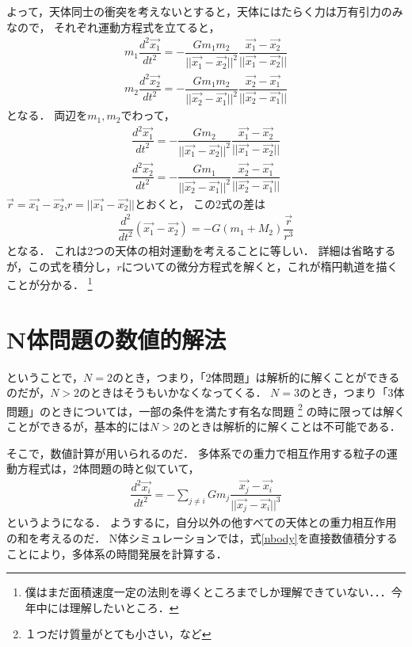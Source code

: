 よって，天体同士の衝突を考えないとすると，天体にはたらく力は万有引力のみなので，
それぞれ運動方程式を立てると，
\begin{align}
m_1 \dfrac{d^2\vec{x_1}}{dt^2} = - \dfrac{G m_1 m_2}{||\vec{x_1}-\vec{x_2}||^2} \dfrac{\vec{x_1}-\vec{x_2}}{||\vec{x_1}-\vec{x_2}||} \\
m_2 \dfrac{d^2\vec{x_2}}{dt^2} = - \dfrac{G m_1 m_2}{||\vec{x_2}-\vec{x_1}||^2} \dfrac{\vec{x_2}-\vec{x_1}}{||\vec{x_2}-\vec{x_1}||}
\end{align}
となる．
両辺を$m_1,m_2$でわって，
\begin{align}
\dfrac{d^2\vec{x_1}}{dt^2} = - \dfrac{G m_2}{||\vec{x_1}-\vec{x_2}||^2} \dfrac{\vec{x_1}-\vec{x_2}}{||\vec{x_1}-\vec{x_2}||} \\
\dfrac{d^2\vec{x_2}}{dt^2} = - \dfrac{G m_1}{||\vec{x_2}-\vec{x_1}||^2} \dfrac{\vec{x_2}-\vec{x_1}}{||\vec{x_2}-\vec{x_1}||}
\end{align}
$\vec{r} = \vec{x_1} - \vec{x_2}$,$r = ||\vec{x_1} - \vec{x_2}||$とおくと，
この2式の差は
\begin{align}
\dfrac{d^2}{dt^2} (\vec{x_1} - \vec{x_2}) = - G (m_1+M_2) \dfrac{\vec{r}}{r^3}
\end{align}
となる．
これは2つの天体の相対運動を考えることに等しい．
詳細は省略するが，この式を積分し，$r$についての微分方程式を解くと，これが楕円軌道を描くことが分かる．
\footnote{僕はまだ面積速度一定の法則を導くところまでしか理解できていない．．．今年中には理解したいところ．}

\section{N体問題の数値的解法}
ということで，$N=2$のとき，つまり，「2体問題」は解析的に解くことができるのだが，$N>2$のときはそうもいかなくなってくる．
$N=3$のとき，つまり「3体問題」のときについては，一部の条件を満たす有名な問題
\footnote{１つだけ質量がとても小さい，など}
の時に限っては解くことができるが，基本的には$N>2$のときは解析的に解くことは不可能である．


そこで，数値計算が用いられるのだ．
多体系での重力で相互作用する粒子の運動方程式は，2体問題の時と似ていて，
\begin{align}
\dfrac{d^2 \vec{x_i}}{dt^2} = - \sum_{j\neq i} G m_j \dfrac{\vec{x_j} - \vec{x_i}}{||\vec{x_j} - \vec{x_i}||^3}
\label{nbody}
\end{align}
というようになる．
ようするに，自分以外の他すべての天体との重力相互作用の和を考えるのだ．
N体シミュレーションでは，式\ref{nbody}を直接数値積分することにより，多体系の時間発展を計算する．

